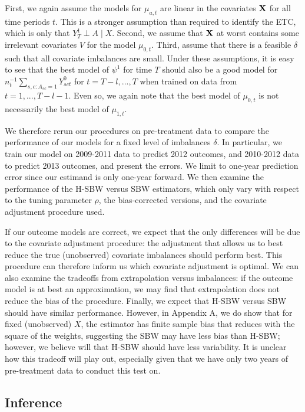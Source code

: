 First, we again assume the models for $\mu_{a, t}$ are linear in the covariates $\mathbf{X}$ for all time periods $t$. This is a stronger assumption than required to identify the ETC, which is only that $Y^1_T \perp A \mid X$. Second, we assume that $\mathbf{X}$ at worst contains some irrelevant covariates $V$ for the model $\mu_{0, t}$. Third, assume that there is a feasible $\delta$ such that all covariate imbalances are small. Under these assumptions, it is easy to see that the best model of $\psi^1$ for time $T$ should also be a good model for $n_t^{-1}\sum_{s,c: A_{sc} = 1}Y_{sct}^0$ for $t = T-l,...,T$ when trained on data from $t = 1, ..., T-l-1$. Even so, we again note that the best model of $\mu_{0, t}$ is not necessarily the best model of $\mu_{1, t}$.

We therefore rerun our procedures on pre-treatment data to compare the performance of our models for a fixed level of imbalances $\delta$. In particular, we train our model on 2009-2011 data to predict 2012 outcomes, and 2010-2012 data to predict 2013 outcomes, and present the errors. We limit to one-year prediction error since our estimand is only one-year forward. We then examine the performance of the H-SBW versus SBW estimators, which only vary with respect to the tuning parameter $\rho$, the bias-corrected versions, and the covariate adjustment procedure used. 

If our outcome models are correct, we expect that the only differences will be due to the covariate adjustment procedure: the adjustment that allows us to best reduce the true (unobserved) covariate imbalances should perform best. This procedure can therefore inform us which covariate adjustment is optimal. We can also examine the tradeoffs from extrapolation versus imbalances: if the outcome model is at best an approximation, we may find that extrapolation does not reduce the bias of the procedure. Finally, we expect that H-SBW versus SBW should have similar performance. However, in Appendix A, we do show that for fixed (unobserved) $X$, the estimator has finite sample bias that reduces with the square of the weights, suggesting the SBW may have less bias than H-SBW; however, we believe will that H-SBW should have less variability. It is unclear how this tradeoff will play out, especially given that we have only two years of pre-treatment data to conduct this test on.

\subsection{Inference}

